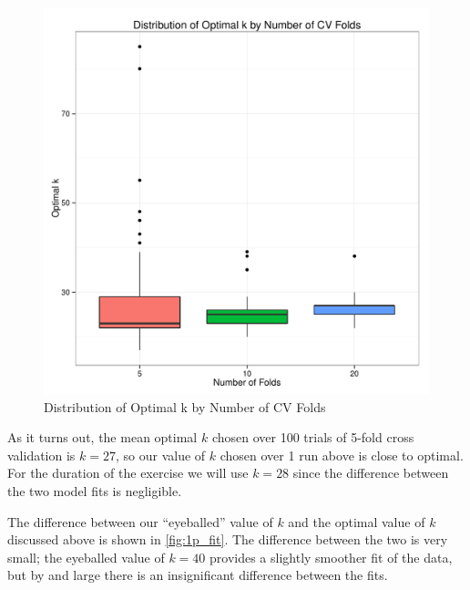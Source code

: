 \documentclass[11pt, fleqn]{article}
\begin{document}
\begin{figure}[!htb]
  \centering
  \includegraphics[scale=.5]{nfolds_k_dist.pdf}
  \caption{Distribution of Optimal k by Number of CV Folds}
  \label{fig:nfolds_k_dist}
\end{figure}

As it turns out, the mean optimal $k$ chosen over 100 trials of 5-fold cross validation is $k=27$, so our value of $k$ chosen over 1 run above is close to optimal. For the duration of the exercise we will use $k=28$ since the difference between the two model fits is negligible.

The difference between our ``eyeballed'' value of $k$ and the optimal value of $k$ discussed above is shown in \cref{fig:1p_fit}. The difference between the two is very small; the eyeballed value of $k=40$ provides a slightly smoother fit of the data, but by and large there is an insignificant difference between the fits.
\end{document}
